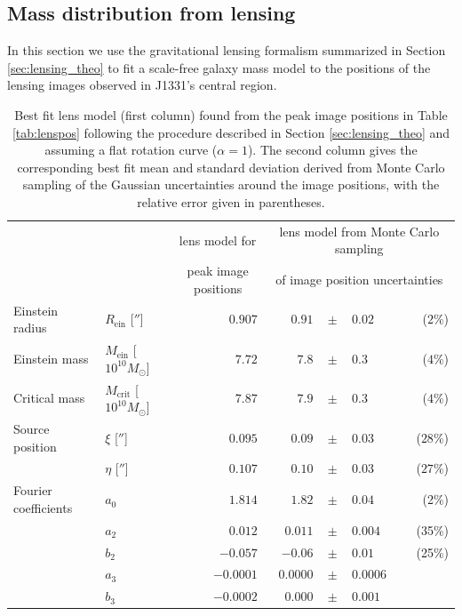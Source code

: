 \documentclass[useAMS,usenatbib]{mnras}
\begin{document}
\subsection{Mass distribution from lensing} \label{sec:results_lensing}

In this section we use the gravitational lensing formalism summarized in Section \ref{sec:lensing_theo} to fit a scale-free galaxy mass model to the positions of the lensing images observed in J1331's central region.

\begin{table}
\centering
\caption{Best fit lens model (first column) found from the peak image positions in Table \ref{tab:lenspos} following the procedure described in Section \ref{sec:lensing_theo} and assuming a flat rotation curve ($\alpha = 1$). The second column gives the corresponding best fit mean and standard deviation derived from Monte Carlo sampling of the Gaussian uncertainties around the image positions, with the relative error given in parentheses.}
\begin{tabular}{llrrclr}
\hline
 &  & \multicolumn{1}{c}{lens model for} &\multicolumn{4}{c}{lens model from Monte Carlo sampling  } \\
 &  & \multicolumn{1}{c}{peak image positions}  & \multicolumn{4}{c}{of image position uncertainties}  \\ \hline
Einstein radius      & $R_\text{ein}$ [$''$]             & $0.907$ & $0.91$  & $\pm$ & $     0.02$ & ($2\%$)\\
Einstein mass        & $M_\text{ein}$ [$10^{10} M_\odot$]  & $7.72$  & $7.8 $  & $\pm$ & $      0.3$ & ($4\%$) \\
Critical mass        & $M_\text{crit}$ [$10^{10} M_\odot$] & $7.87$  & $7.9$   & $\pm$ & $      0.3$ & ($4\%$)\\
Source position      & $\xi$ [$''$]                      & $0.095$ & $0.09 $ & $\pm$ & $     0.03$ & ($28\%$)\\
                     & $\eta$ [$''$]                     & $0.107$ & $0.10 $ & $\pm$ & $     0.03$ & ($27\%$)\\
Fourier coefficients & $a_0$                               & $1.814$ & $1.82 $ & $\pm$ & $   0.04$ & (2\%)\\
                     & $a_2$                               & $0.012$ & $ 0.011 $ & $\pm$ & $    0.004$ & (35\%)\\
                     & $b_2$                               & $-0.057$ & $-0.06 $  & $\pm$ & $  0.01$ & (25\%)\\
                     & $a_3$                               & $-0.0001$& $0.0000 $ & $\pm$ & $   0.0006$ & \\
                     & $b_3$                               & $-0.0002$&$0.000 $   & $\pm$ & $  0.001$ & \\\hline
\end{tabular}  
\label{tab:bestfitlensmodel} 
\end{table}
\end{document}
